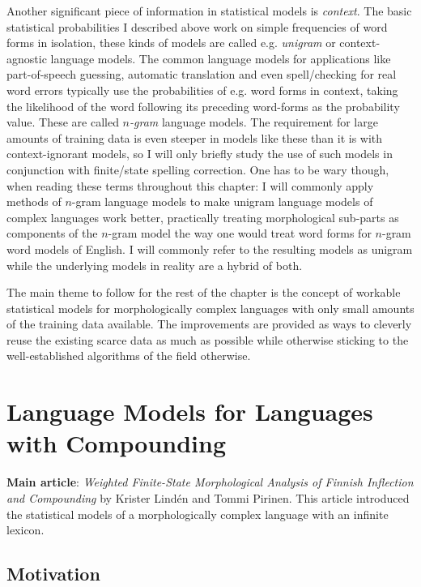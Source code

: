 \documentclass[officiallayout,final]{unihelcompling}
\begin{document}
Another significant piece of information in statistical models is
\emph{context}. The basic statistical probabilities I described above work on
simple frequencies of word forms in isolation, these kinds of models are called
e.g. \emph{unigram} or context-agnostic language models. The common language
models for applications like part-of-speech guessing, automatic translation and
even spell\-/checking for real word errors typically use the probabilities of
e.g.  word forms in context, taking the likelihood of the word following its
preceding word-forms as the probability value.  These are called
\emph{\(n\)-gram} language models.  The requirement for large amounts of
training data is even steeper in models like these than it is with
context-ignorant models, so I will only briefly study the use of such models in
conjunction with finite\-/state spelling correction. One has to be wary though,
when reading these terms throughout this chapter: I will commonly apply methods
of \(n\)-gram language models to make unigram language models of complex
languages work better, practically treating morphological sub-parts as
components of the \(n\)-gram model the way one would treat word forms for
\(n\)-gram word models of English. I will commonly refer to the resulting
models as unigram while the underlying models in reality are a hybrid of both.

The main theme to follow for the rest of the chapter is the concept of workable
statistical models for morphologically complex languages with only small
amounts of the training data available. The improvements are provided as ways
to cleverly reuse the existing scarce data as much as possible while otherwise
sticking to the well-established algorithms of the field otherwise.

\section{Language Models for Languages with Compounding}
\label{sec:compounding}

\textbf{Main article}: \emph{Weighted Finite-State Morphological Analysis of
Finnish Inflection and Compounding}  by Krister
Lindén and Tommi Pirinen. This article introduced the statistical models of a
morphologically complex language with an infinite lexicon.

\subsection{Motivation}
\end{document}
